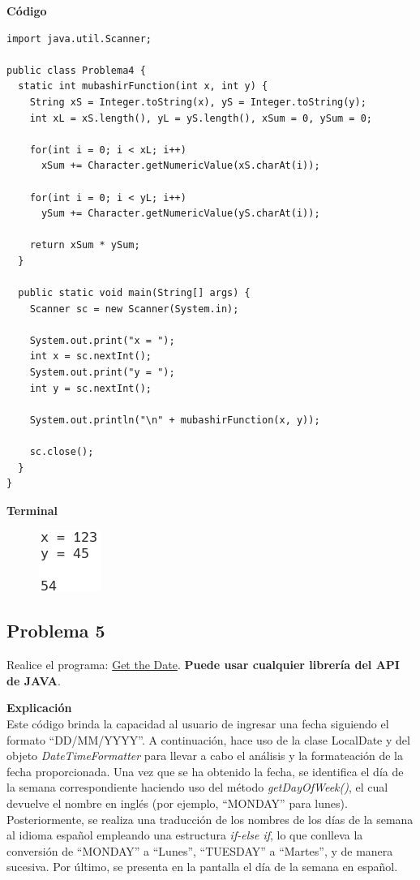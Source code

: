 \documentclass[11pt, twocolumn]{article}
\begin{document}
  \textbf{Código}
  \begin{lstlisting}
import java.util.Scanner;

public class Problema4 {
  static int mubashirFunction(int x, int y) {
    String xS = Integer.toString(x), yS = Integer.toString(y);
    int xL = xS.length(), yL = yS.length(), xSum = 0, ySum = 0;

    for(int i = 0; i < xL; i++)
      xSum += Character.getNumericValue(xS.charAt(i));
    
    for(int i = 0; i < yL; i++)
      ySum += Character.getNumericValue(yS.charAt(i));
    
    return xSum * ySum;
  }

  public static void main(String[] args) {
    Scanner sc = new Scanner(System.in);

    System.out.print("x = ");
    int x = sc.nextInt();
    System.out.print("y = ");
    int y = sc.nextInt();

    System.out.println("\n" + mubashirFunction(x, y));

    sc.close();
  }
}
  \end{lstlisting}

  \textbf{Terminal}
  \begin{figure}[ht]
    \includegraphics[width=0.15\columnwidth, center]{P4.png}
  \end{figure}

  \subsection*{Problema 5}
  Realice el programa:  \href{https://edabit.com/challenge/48EJWLhF224na8po3}{Get the Date}. \textbf{Puede usar cualquier librería del API de JAVA}.

  \textbf{Explicación} \\
  Este código brinda la capacidad al usuario de ingresar una fecha siguiendo el formato ``DD/MM/YYYY''. A continuación, hace uso de la clase LocalDate y del objeto \textit{DateTimeFormatter} para llevar a cabo el análisis y la formateación de la fecha proporcionada. Una vez que se ha obtenido la fecha, se identifica el día de la semana correspondiente haciendo uso del método \textit{getDayOfWeek()}, el cual devuelve el nombre en inglés (por ejemplo, ``MONDAY'' para lunes). Posteriormente, se realiza una traducción de los nombres de los días de la semana al idioma español empleando una estructura \textit{if-else if}, lo que conlleva la conversión de ``MONDAY'' a ``Lunes'', ``TUESDAY'' a ``Martes'', y de manera sucesiva. Por último, se presenta en la pantalla el día de la semana en español. 
  
\end{document}
